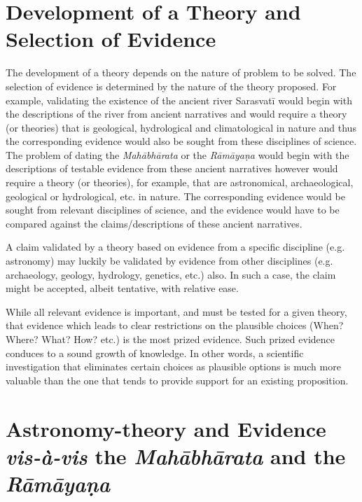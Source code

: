 \vspace{-.3cm}

\section*{Development of a Theory \hfill\break and Selection of Evidence}

The development of a theory depends on the nature of problem to be solved. The selection of evidence is determined by the nature of the theory proposed. For example, validating the existence of the ancient river Sarasvatī would begin with the descriptions of the river from ancient narratives and would require a theory (or theories) that is geological, hydrological and climatological in nature and thus the corresponding evidence would also be sought from these disciplines of science. The problem of dating the \textit{Mahābhārata} or the \textit{Rāmāyaṇa} would begin with the descriptions of testable evidence from these ancient narratives however would require a theory (or theories), for example, that are astronomical, archaeological, geological or hydrological, etc. in nature. The corresponding evidence would be sought from relevant disciplines of science, and the evidence would have to be compared against the claims/descriptions of these ancient narratives.

A claim validated by a theory based on evidence from a specific discipline (e.g. astronomy) may luckily be validated by evidence from other disciplines (e.g. archaeology, geology, hydrology, genetics, etc.) also. In such a case, the claim might be accepted, albeit tentative, with relative ease.

While all relevant evidence is important, and must be tested for a given theory, that evidence which leads to clear restrictions on the plausible choices (When? Where? What? How? etc.) is the most prized evidence. Such prized evidence conduces to a sound growth of knowledge. In other words, a scientific investigation that eliminates certain choices as plausible options is much more valuable than the one that tends to provide support for an existing proposition.

\vspace{-.3cm}

\section*{Astronomy-theory and Evidence \textit{vis-à-vis} \hfill\break the \textit{Mahābhārata} and the \textit{Rāmāyaṇa}}

